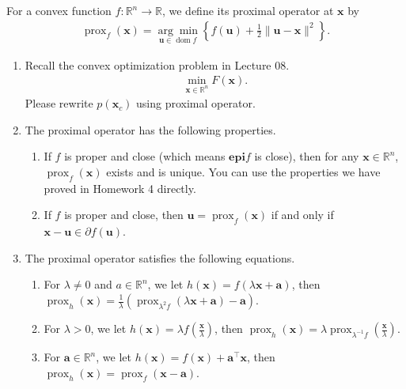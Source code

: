 \documentclass[11pt,letter,notitlepage]{article}
\begin{document}
\begin{exercise}
For a convex function $f:\mathbb{R}^n\to\mathbb{R}$, we define its proximal operator at $\mathbf{x}$ by
\begin{align*}
    \operatorname{prox}_{f}(\mathbf{x})=\underset{\mathbf{u} \in \operatorname{dom} f}{\arg \min }\left\{f(\mathbf{u})+\frac{1}{2}\|\mathbf{u}-\mathbf{x}\|^{2}\right\}.
\end{align*}

\begin{enumerate}
    \item Recall the convex optimization problem in Lecture 08.
    \begin{align*}
      \min _{\mathbf{x} \in \mathbb{R}^{n}} F(\mathbf{x}).
    \end{align*}
    Please rewrite $p(\mathbf{x}_c)$ using proximal operator.
  \item The proximal operator has the following properties.
    \begin{enumerate}
      \item If $f$ is proper and close (which means $\mathbf{epi} f$ is close), then for any $\mathbf{x}\in\mathbb{R}^n$, $\operatorname{prox}_{f}(\mathbf{x})$ exists and is unique. You can use the properties we have proved in Homework 4 directly.
      \item If $f$ is proper and close, then $\mathbf{u}=\operatorname{prox}_{f}(\mathbf{x})$ if and only if $\mathbf{x}-\mathbf{u} \in \partial f(\mathbf{u})$.


    \end{enumerate}
  \item The proximal operator satisfies the following equations.
  \begin{enumerate}
    \item For $\lambda\not=0$ and $a\in\mathbb{R}^n$, we let $h(\mathbf{x})=f(\lambda \mathbf{x}+\mathbf{a})$, then $ \operatorname{prox}_{h}(\mathbf{x})=\frac{1}{\lambda}\left(\operatorname{prox}_{\lambda^{2} f}(\lambda \mathbf{x}+\mathbf{a})-\mathbf{a}\right)$.
    \item For $\lambda>0$, we let $h(\mathbf{x})=\lambda f\left(\frac{\mathbf{x}}{\lambda}\right)$, then $ \operatorname{prox}_{h}(\mathbf{x})=\lambda \operatorname{prox}_{\lambda^{-1} f}\left(\frac{\mathbf{x}}{\lambda}\right)$.
    \item For $\mathbf{a}\in\mathbb{R}^n$, we let $h(\mathbf{x})=f(\mathbf{x})+\mathbf{a}^\top \mathbf{x}$, then $ \operatorname{prox}_{h}(\mathbf{x})=\operatorname{prox}_{f}(\mathbf{x}-\mathbf{a})$.


\end{enumerate}
\end{enumerate}
\end{exercise}
\end{document}
